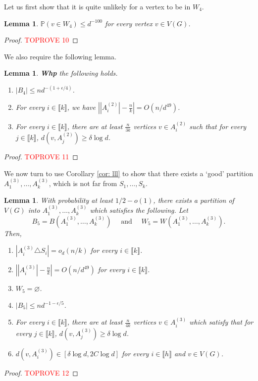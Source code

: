 \documentclass[notitlepage]{scrartcl}
\newcommand{\br}[1]{\llbracket{#1}\rrbracket}
\newtheorem{lemma}[thm]{Lemma}
\renewcommand{\Pr}{\mathbb{P}}
\begin{document}
Let us first show that it is quite unlikely for a vertex to be in $W_4$.
\begin{lemma}\label{l: prob w0}
    $\Pr(v \in W_4) \le d^{-100}$ for every vertex $v \in V(G)$.
\end{lemma}
\begin{proof}\textcolor{red}{TOPROVE 10}\end{proof}

We also require the following lemma.
\begin{lemma}\label{l: typical tilde a}
\textbf{Whp} the following holds.
    \begin{enumerate}
        \item $|B_4| \le n d^{-(1 + \epsilon/4)}$.
        \item For every $i\in \br{k}$, we have $\left||A_{i}^{(2)}|-\frac{n}{k}\right|=O(n/d^{49})$.
        \item For every $i\in \br{k}$, there are at least $\frac{n}{3k}$ vertices $v\in A_i^{(2)}$ such that for every $j\in \br{k}$, $d(v,A_j^{(2)})\ge \delta\log d$.  
    \end{enumerate}
\end{lemma}
\begin{proof}\textcolor{red}{TOPROVE 11}\end{proof}

We now turn to use Corollary \ref{cor: lll} to show that there exists a `good' partition $A_1^{(3)},\ldots, A_k^{(3)}$, which is not far from $S_1,\ldots, S_k$.
\begin{lemma}\label{l: third lll}
With probability at least $1/2-o(1)$, there exists a partition of $V(G)$ into $A_1^{(3)},\ldots, A_k^{(3)}$ which satisfies the following. Let 
$$
B_5=B\left(A_1^{(3)},\ldots, A_k^{(3)}\right)
\quad\text{ and }\quad
W_5=W\left(A_1^{(3)},\ldots, A_k^{(3)}\right).
$$
Then,
\begin{enumerate}
    \item $\left|A_i^{(3)}\triangle S_i\right|=o_d(n/k)$ for every $i\in \br{k}$.\label{l: item third lll}
    \item $\left||A_i^{(3)}|-\frac{n}{k}\right|=O(n/d^{49})$ for every $i\in \br{k}$.
    \item $W_5=\varnothing$.
    \item $|B_5|\le nd^{-1-\epsilon/5}$.
    \item For every $i\in \br{k}$, there are at least $\frac{n}{4k}$ vertices $v \in A_i^{(3)}$ which satisfy that for every $j\in \br{k}$, $d(v,A_j^{(3)})\ge \delta\log d$. 
    \item $d(v, A_i^{(3)})\in \left[\delta \log d, 2C\log d\right]$ for every $i\in \br{h}$ and $v\in V(G)$.
\end{enumerate}
\end{lemma}
\begin{proof}\textcolor{red}{TOPROVE 12}\end{proof}
\end{document}
